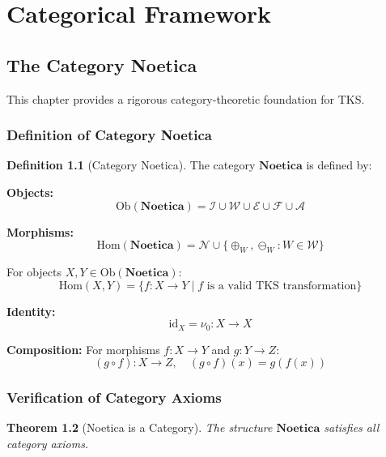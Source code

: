 \documentclass[11pt,twoside,openright]{book}
\theoremstyle{definition}
\newtheorem{definition}{Definition}[chapter]
\theoremstyle{plain}
\newtheorem{theorem}[definition]{Theorem}
\theoremstyle{remark}
\newcommand{\Worlds}{\mathcal{W}}
\newcommand{\Ideas}{\mathcal{I}}
\newcommand{\Elements}{\mathcal{E}}
\newcommand{\Noetics}{\mathcal{N}}
\newcommand{\Foundations}{\mathcal{F}}
\newcommand{\Acquisitions}{\mathcal{A}}
\newcommand{\Noetica}{\mathbf{Noetica}}
\newcommand{\noe}[1]{\nu_{#1}}
\newcommand{\Ob}{\mathrm{Ob}}
\newcommand{\Hom}{\mathrm{Hom}}
\newcommand{\id}{\mathrm{id}}
\begin{document}
\part{Categorical Framework}

\chapter{The Category Noetica}
\label{ch:category-noetica}

This chapter provides a rigorous category-theoretic foundation for TKS.

\section{Definition of Category Noetica}

\begin{definition}[Category Noetica]
\label{def:category-noetica}
The category $\Noetica$ is defined by:

\textbf{Objects:}
\[
\Ob(\Noetica) = \Ideas \cup \Worlds \cup \Elements \cup \Foundations \cup \Acquisitions
\]

\textbf{Morphisms:}
\[
\Hom(\Noetica) = \Noetics \cup \{\oplus_W, \ominus_W : W \in \Worlds\}
\]

For objects $X, Y \in \Ob(\Noetica)$:
\[
\Hom(X, Y) = \{f : X \to Y \mid f \text{ is a valid TKS transformation}\}
\]

\textbf{Identity:}
\[
\id_X = \noe{0} : X \to X
\]

\textbf{Composition:}
For morphisms $f : X \to Y$ and $g : Y \to Z$:
\[
(g \circ f) : X \to Z, \quad (g \circ f)(x) = g(f(x))
\]
\end{definition}

\section{Verification of Category Axioms}

\begin{theorem}[Noetica is a Category]
\label{thm:noetica-category}
The structure $\Noetica$ satisfies all category axioms.
\end{theorem}
\end{document}
